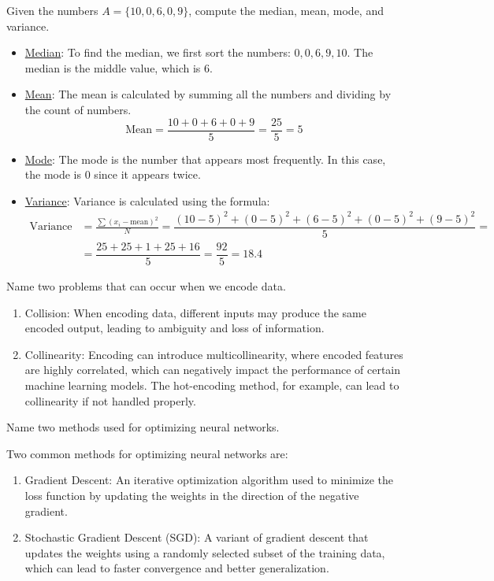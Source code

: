 \documentclass[12pt]{article}
\begin{document}
    \begin{ejercicio}
        Given the numbers $A = \{10, 0, 6, 0, 9\}$, compute the median, mean, mode, and variance.
        \begin{itemize}
            \item \ul{Median}: To find the median, we first sort the numbers: $0, 0, 6, 9, 10$. The median is the middle value, which is $6$.
            \item \ul{Mean}: The mean is calculated by summing all the numbers and dividing by the count of numbers. 
            \[ \text{Mean} = \frac{10 + 0 + 6 + 0 + 9}{5} = \frac{25}{5} = 5 \]
            \item \ul{Mode}: The mode is the number that appears most frequently. In this case, the mode is $0$ since it appears twice.
            \item \ul{Variance}: Variance is calculated using the formula:
            \begin{align*}
                \text{Variance} &= \frac{\sum (x_i - \text{mean})^2}{N} = \dfrac{(10-5)^2 + (0-5)^2 + (6-5)^2 + (0-5)^2 + (9-5)^2}{5} =\\&= \dfrac{25 + 25 + 1 + 25 + 16}{5} = \dfrac{92}{5} = 18.4
            \end{align*}
        \end{itemize}
    \end{ejercicio}

    \begin{ejercicio}
        Name two problems that can occur when we encode data.
        \begin{enumerate}
            \item Collision: When encoding data, different inputs may produce the same encoded output, leading to ambiguity and loss of information.
            \item Collinearity: Encoding can introduce multicollinearity, where encoded features are highly correlated, which can negatively impact the performance of certain machine learning models. The hot-encoding method, for example, can lead to collinearity if not handled properly.
        \end{enumerate}
    \end{ejercicio}

    \begin{ejercicio}
        Name two methods used for optimizing neural networks.

        Two common methods for optimizing neural networks are:
        \begin{enumerate}
            \item Gradient Descent: An iterative optimization algorithm used to minimize the loss function by updating the weights in the direction of the negative gradient.
            \item Stochastic Gradient Descent (SGD): A variant of gradient descent that updates the weights using a randomly selected subset of the training data, which can lead to faster convergence and better generalization.
        \end{enumerate}
    \end{ejercicio}
\end{document}
